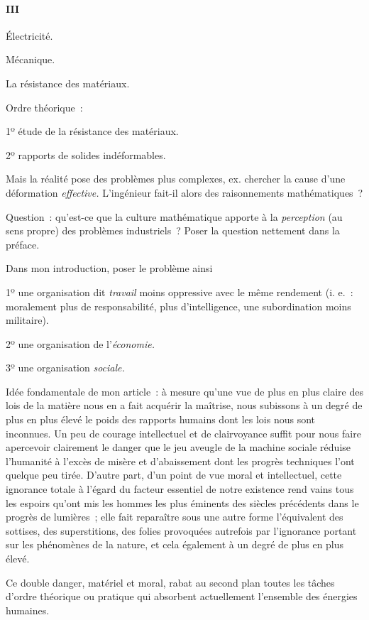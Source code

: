 \documentclass[french,twoside]{book} %
\begin{document}
\paragraph[{III}]{III}
\noindent Électricité.\par
Mécanique.\par
La résistance des matériaux.\par
Ordre théorique :\par
1º étude de la résistance des matériaux.\par
2º rapports de solides indéformables.\par
Mais la réalité pose des problèmes plus complexes, ex. chercher la cause d'une déformation {\itshape effective.} L'ingénieur fait-il alors des raisonnements mathématiques ?\par
Question : qu'est-ce que la culture mathématique apporte à la {\itshape perception} (au sens propre) des problèmes industriels ? Poser la question nettement dans la préface.\par
Dans mon introduction, poser le problème ainsi\par
1º une organisation dit {\itshape travail} moins oppressive avec le même rendement (i. e. : moralement plus de responsabilité, plus d'intelligence, une subordination moins militaire).\par
2º une organisation de l’{\itshape économie.}\par
3º une organisation {\itshape sociale.}\par
Idée fondamentale de mon article : à mesure qu'une vue de plus en plus claire des lois de la matière nous en a fait acquérir la maîtrise, nous subissons à un degré de plus en plus élevé le poids des rapports humains dont les lois nous sont inconnues. Un peu de courage intellectuel et de clairvoyance suffit pour nous faire apercevoir clairement le danger que le jeu aveugle de la machine sociale réduise l'humanité à l'excès de misère et d'abaissement dont les progrès techniques l'ont quelque peu tirée. D'autre part, d'un point de vue moral et intellectuel, cette ignorance totale à l'égard du facteur essentiel de notre existence rend vains tous les espoirs qu'ont mis les hommes les plus éminents des siècles précédents dans le progrès de lumières ; elle fait reparaître sous une autre forme l'équivalent des sottises, des superstitions, des folies provoquées autrefois par l'ignorance portant sur les phénomènes de la nature, et cela également à un degré de plus en plus élevé.\par
Ce double danger, matériel et moral, rabat au second plan toutes les tâches d'ordre théorique ou pratique qui absorbent actuellement l'ensemble des énergies humaines.\par
\end{document}
